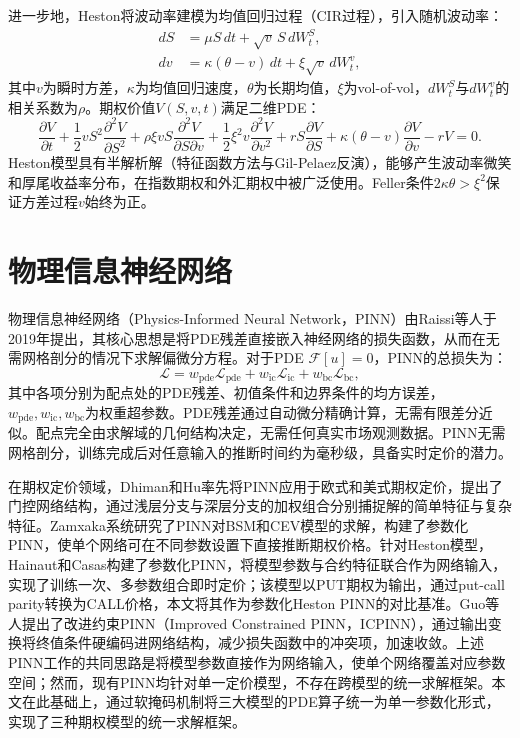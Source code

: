 进一步地，Heston\cite{heston1993closed}将波动率建模为均值回归过程（CIR过程），引入随机波动率：
\begin{align}
  dS &= \mu S\,dt + \sqrt{v}\,S\,dW_t^S, \\
  dv &= \kappa(\theta - v)\,dt + \xi\sqrt{v}\,dW_t^v,
\end{align}
其中$v$为瞬时方差，$\kappa$为均值回归速度，$\theta$为长期均值，$\xi$为vol-of-vol，$dW_t^S$与$dW_t^v$的相关系数为$\rho$。期权价值$V(S,v,t)$满足二维PDE：
\begin{equation}\label{eq:heston}
  \frac{\partial V}{\partial t}
  + \frac{1}{2}vS^2\frac{\partial^2 V}{\partial S^2}
  + \rho\xi v S\frac{\partial^2 V}{\partial S\partial v}
  + \frac{1}{2}\xi^2 v\frac{\partial^2 V}{\partial v^2}
  + rS\frac{\partial V}{\partial S}
  + \kappa(\theta-v)\frac{\partial V}{\partial v}
  - rV = 0.
\end{equation}
Heston模型具有半解析解（特征函数方法与Gil-Pelaez反演），能够产生波动率微笑和厚尾收益率分布，在指数期权和外汇期权中被广泛使用。Feller条件$2\kappa\theta>\xi^2$保证方差过程$v$始终为正。

\section{物理信息神经网络}\label{sec:pinn}

物理信息神经网络（Physics-Informed Neural Network，PINN）由Raissi等人\cite{raissi2019physics}于2019年提出，其核心思想是将PDE残差直接嵌入神经网络的损失函数，从而在无需网格剖分的情况下求解偏微分方程。对于PDE $\mathcal{F}[u]=0$，PINN的总损失为：
\begin{equation}\label{eq:pinn_loss}
  \mathcal{L} = w_{\text{pde}}\mathcal{L}_{\text{pde}}
              + w_{\text{ic}}\mathcal{L}_{\text{ic}}
              + w_{\text{bc}}\mathcal{L}_{\text{bc}},
\end{equation}
其中各项分别为配点处的PDE残差、初值条件和边界条件的均方误差，$w_{\text{pde}},w_{\text{ic}},w_{\text{bc}}$为权重超参数。PDE残差通过自动微分精确计算，无需有限差分近似。配点完全由求解域的几何结构决定，无需任何真实市场观测数据。PINN无需网格剖分，训练完成后对任意输入的推断时间约为毫秒级，具备实时定价的潜力。

在期权定价领域，Dhiman和Hu\cite{dhiman2023pinn}率先将PINN应用于欧式和美式期权定价，提出了门控网络结构，通过浅层分支与深层分支的加权组合分别捕捉解的简单特征与复杂特征。Zamxaka\cite{zamxaka2023cev}系统研究了PINN对BSM和CEV模型的求解，构建了参数化PINN，使单个网络可在不同参数设置下直接推断期权价格。针对Heston模型，Hainaut和Casas\cite{hainaut2024heston}构建了参数化PINN，将模型参数与合约特征联合作为网络输入，实现了训练一次、多参数组合即时定价；该模型以PUT期权为输出，通过put-call parity转换为CALL价格，本文将其作为参数化Heston PINN的对比基准。Guo等人\cite{guo2024icpinn}提出了改进约束PINN（Improved Constrained PINN，ICPINN），通过输出变换将终值条件硬编码进网络结构，减少损失函数中的冲突项，加速收敛。上述PINN工作的共同思路是将模型参数直接作为网络输入，使单个网络覆盖对应参数空间；然而，现有PINN均针对单一定价模型，不存在跨模型的统一求解框架。本文在此基础上，通过软掩码机制将三大模型的PDE算子统一为单一参数化形式，实现了三种期权模型的统一求解框架。

